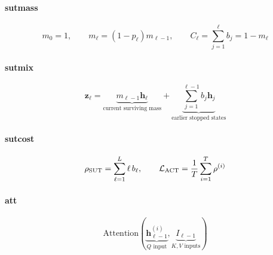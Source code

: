 \documentclass{article}
\begin{document}
\paragraph{sutmass}
\[
m_0=1,\qquad m_{\ell}=(1-p_{\ell})m_{\ell-1},\qquad C_{\ell}=\sum_{j=1}^{\ell}b_j=1-m_{\ell}
\]

\paragraph{sutmix}
\[
\mathbf{z}_{\ell}=\underbrace{m_{\ell-1}\mathbf{h}_{\ell}}_{\text{current surviving mass}}+\underbrace{\sum_{j=1}^{\ell-1}b_j\mathbf{h}_j}_{\text{earlier stopped states}}
\]

\paragraph{sutcost}
\[
\rho_{\rm SUT}=\sum_{\ell=1}^{L}\ell\,b_{\ell},\qquad \mathcal{L}_{\rm ACT}=\frac{1}{T}\sum_{i=1}^{T}\rho^{(i)}
\]

\paragraph{att}
\[
\mathrm{Attention}\!\left(\underbrace{\mathbf{h}_{\ell-1}^{(i)}}_{Q\text{ input}},\underbrace{I_{\ell-1}}_{K,V\text{ inputs}}\right)
\]
\end{document}
